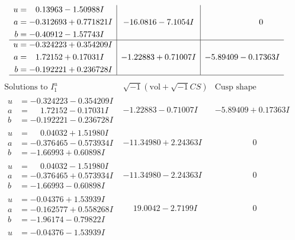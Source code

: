 \documentclass[1p]{elsarticle_modified}
\theoremstyle{definition}
\newcommand{\I}{\sqrt{-1}}
\begin{document}
$$\begin{array}{c|c|c}
\begin{aligned}
u &= \phantom{-}0.13963 - 1.50988 I \\
a &= -0.312693 + 0.771821 I \\
b &= -0.40912 - 1.57743 I\end{aligned}
 & -16.0816 - 7.1054 I & \phantom{-0.000000 } 0 \\ \hline\begin{aligned}
u &= -0.324223 + 0.354209 I \\
a &= \phantom{-}1.72152 + 0.17031 I \\
b &= -0.192221 + 0.236728 I\end{aligned}
 & -1.22883 + 0.71007 I & -5.89409 - 0.17363 I\\
 \hline 
 \end{array}$$\newpage$$\begin{array}{c|c|c}  
\text{Solutions to }I^u_{1}& \I (\text{vol} + \sqrt{-1}CS) & \text{Cusp shape}\\
 \hline 
\begin{aligned}
u &= -0.324223 - 0.354209 I \\
a &= \phantom{-}1.72152 - 0.17031 I \\
b &= -0.192221 - 0.236728 I\end{aligned}
 & -1.22883 - 0.71007 I & -5.89409 + 0.17363 I \\ \hline\begin{aligned}
u &= \phantom{-}0.04032 + 1.51980 I \\
a &= -0.376465 - 0.573934 I \\
b &= -1.66993 + 0.60898 I\end{aligned}
 & -11.34980 + 2.24363 I & \phantom{-0.000000 } 0 \\ \hline\begin{aligned}
u &= \phantom{-}0.04032 - 1.51980 I \\
a &= -0.376465 + 0.573934 I \\
b &= -1.66993 - 0.60898 I\end{aligned}
 & -11.34980 - 2.24363 I & \phantom{-0.000000 } 0 \\ \hline\begin{aligned}
u &= -0.04376 + 1.53939 I \\
a &= -0.162577 + 0.558268 I \\
b &= -1.96174 - 0.79822 I\end{aligned}
 & \phantom{-}19.0042 - 2.7199 I & \phantom{-0.000000 } 0 \\ \hline\begin{aligned}
u &= -0.04376 - 1.53939 I \\

\end{aligned}
\end{array}$$
\end{document}
